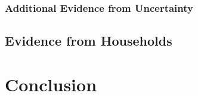 \documentclass[]{article}
\begin{document}
\subsubsection{Additional Evidence from Uncertainty}

\subsection{Evidence from Households}

\section{Conclusion}




\end{document}
